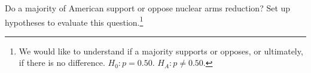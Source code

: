 \begin{exercise}
Do a majority of American support or oppose nuclear arms
reduction? Set up hypotheses to evaluate this
question.\footnote{We would like to understand if a majority
  supports or opposes, or ultimately, if there is no difference.
  $H_0: p = 0.50$. $H_A: p \neq 0.50$.}
\end{exercise}

\newcommand{\gallupnucleararmspollsize}{1028}
\newcommand{\gallupnucleararmspollprop}{0.56}
\newcommand{\gallupnucleararmspollpropcomplement}{0.44}
\newcommand{\gallupnucleararmspollpercent}{56}
\newcommand{\gallupnucleararmspollpercentcomplement}{44}
\newcommand{\gallupnucleararmspollnullcount}{514}
\newcommand{\gallupnucleararmspollse}{0.0155}
\newcommand{\gallupnucleararmspollnullvalue}{0.5}
\newcommand{\gallupnucleararmspollnullse}{0.0156}

